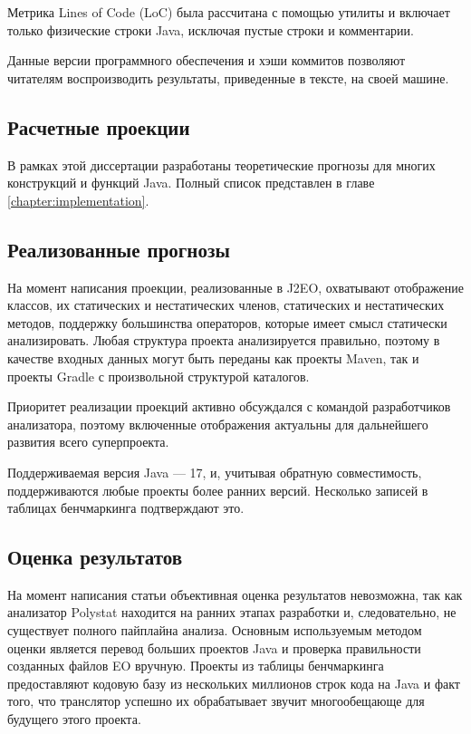 \documentclass[oneside,final,14pt,a4paper]{extreport}
\theoremstyle{definition}
\theoremstyle{remark}
\theoremstyle{remark}
\begin{document}
Метрика Lines of Code (LoC) была рассчитана с помощью утилиты \cite{cloc} и включает только физические строки Java, исключая пустые строки и комментарии.

Данные версии программного обеспечения и хэши коммитов позволяют читателям воспроизводить результаты, приведенные в тексте, на своей машине.

\subsection{Расчетные проекции}

В рамках этой диссертации разработаны теоретические прогнозы для многих конструкций и функций Java. Полный список представлен в главе \ref{chapter:implementation}.

\subsection{Реализованные прогнозы}

На момент написания проекции, реализованные в J2EO, охватывают отображение классов, их статических и нестатических членов, статических и нестатических методов, поддержку большинства операторов, которые имеет смысл статически анализировать. Любая структура проекта анализируется правильно, поэтому в качестве входных данных могут быть переданы как проекты Maven, так и проекты Gradle с произвольной структурой каталогов.

Приоритет реализации проекций активно обсуждался с командой разработчиков анализатора, поэтому включенные отображения актуальны для дальнейшего развития всего суперпроекта.

Поддерживаемая версия Java — 17, и, учитывая обратную совместимость, поддерживаются любые проекты более ранних версий. Несколько записей в таблицах бенчмаркинга подтверждают это.

\subsection{Оценка результатов}

На момент написания статьи объективная оценка результатов невозможна, так как анализатор Polystat находится на ранних этапах разработки и, следовательно, не существует полного пайплайна анализа.
Основным используемым методом оценки является перевод больших проектов Java и проверка правильности созданных файлов EO вручную. Проекты из таблицы бенчмаркинга предоставляют кодовую базу из нескольких миллионов строк кода на Java и факт того, что транслятор успешно их обрабатывает звучит многообещающе для будущего этого проекта.
\end{document}
